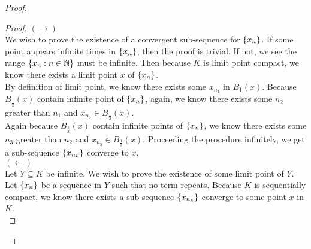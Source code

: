 \documentclass{report}
\begin{document}
\begin{proof}
\begin{proof}
$(\longrightarrow)$\\

We wish to prove the existence of a convergent sub-sequence for $\{ x_n \}$. If some point appears infinite times in $\{ x_n \}$, then the proof is trivial. If not, we see the range $\{ x_n:n\in\mathbb{N} \}$ must be infinite. Then because $K$ is limit point compact, we know there exists a limit point $x$ of $\{ x_n \}$.\\

By definition of limit point, we know there exists some $x_{n_1}$ in $B_1(x)$. Because $B_{\frac{1}{2}}(x)$ contain infinite point of $\{ x_n \}$, again, we know there exists some $n_2$ greater than  $n_1$ and  $x_{n_2}\in B_{\frac{1}{2}}(x)$.\\

Again because $B_{\frac{1}{3}}(x)$ contain infinite points of $\{ x_n \}$, we know there exists some $n_3$ greater than  $n_2$ and $x_{n_3}\in B_{\frac{1}{3}}(x)$. Proceeding the procedure infinitely, we get a sub-sequence $\{ x_{n_k} \}$ converge to $x$.\\

$(\longleftarrow)$\\

Let $Y\subseteq K$ be infinite. We wish to prove the existence of some limit point of $Y$.\\

Let $\{ x_n \}$ be a sequence in $Y$ such that no term repeats. Because $K$ is sequentially compact, we know there exists a sub-sequence $\{ x_{n_k} \}$ converge to some point $x$ in  $K$. \\


\end{proof}
\end{proof}
\end{document}
